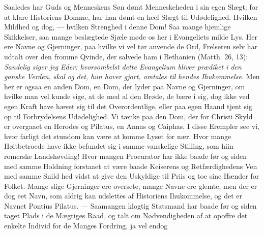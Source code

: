 \documentclass[12pt,a4paper]{book}
\begin{document}
Saaledes har Guds og Menneskens Søn dømt Menneskeheden i sin egen Slægt; for at klare
Historiens Domme, har han dømt en heel Slægt til Udødelighed. Hvilken Mildhed og dog,
--- hvilken Strenghed i denne Dom! Saa mange hjemlige Skikkelser, saa mange beslægtede
Sjæle møde os her i Evangeliets milde Lys. Her ere Navne og Gjerninger, paa hvilke vi
vel tør anvende de Ord, Frelseren selv har udtalt over den fromme Qvinde, der salvede
ham i Bethanien (Matth. 26, 13): \emph{Sandelig siger jeg Eder: hvorsombelst dette
Evangelium bliver prædiket i den ganske Verden, skal og det, hun haver gjort, omtales
til hendes Ihukommelse.} Men her er ogsaa en anden Dom, en Dom, der lyder paa Navne og
Gjerninger, om hvilke man vel kunde sige, at de med al den Brøde, de bære i sig, dog
ikke ved egen Kraft have hævet sig til det Overordentlige, eller paa egen Haand tjent
sig op til Forbrydelsens Udødelighed. Vi tænke paa den Dom, der for Christi Skyld er
overgaaet en Herodes og Pilatus, en Annas og Caiphas. I disse Erempler see vi, hvor
farligt det stundom kan være at komme Lyset for nær. Hvor mange Høitbetroede have ikke
befundet sig i samme vanskelige Stilling, som hiin romerske Landshøvding! Hvor mangen
Procurator har ikke baade før og siden med samme Holdning forstaaet at være baade
Keiserens og Retfærdighedens Ven med samme Snild\-%
hed vidst at give den Uskyldige til Priis og toe sine Hænder for Folket. Mange slige
Gjerninger ere oversete, mange Navne ere glemte; men der er dog eet Navn, som aldrig kan
udslettes af Historiens Ihukommelse, og det er Navnet Pontius Pilatus. --- Saamangen
klogtig Statsmand har baade før og siden taget Plads i de Mægtiges Raad, og talt om
Nødvendigheden af at opoffre det enkelte Individ for de Manges Fordring, ja vel endog
\end{document}

